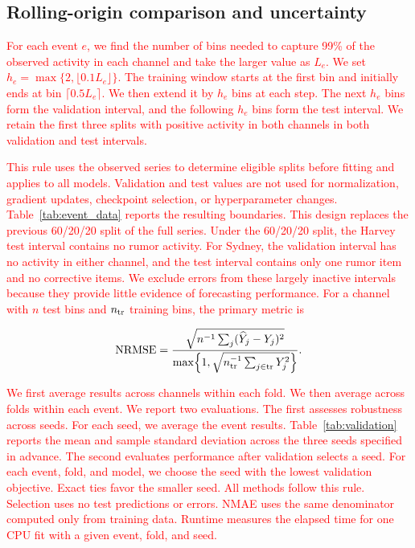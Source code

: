 \documentclass[letterpaper,journal]{IEEEtran}
\begin{document}
	

	\subsection{Rolling-origin comparison and uncertainty}

	\textcolor{red}{
	For each event $e$, we find the number of bins needed to capture 99\% of the observed activity in each channel and take the larger value as $L_e$. 
	We set $h_e=\max\{2,\lfloor0.1L_e\rfloor\}$. 
	The training window starts at the first bin and initially ends at bin $\lceil0.5L_e\rceil$. 
	We then extend it by $h_e$ bins at each step. 
	The next $h_e$ bins form the validation interval, 
	and the following $h_e$ bins form the test interval. 
	We retain the first three splits with positive activity in both channels in both validation and test intervals.
	}

	\textcolor{red}{
	This rule uses the observed series to determine eligible splits before fitting and applies to all models. 
	Validation and test values are not used for normalization, gradient updates, checkpoint selection, or hyperparameter changes. 
	Table~\ref{tab:event_data} reports the resulting boundaries.
	}
	\textcolor{red}{
	This design replaces the previous 60/20/20 split of the full series. 
	Under the 60/20/20 split, the Harvey test interval contains no rumor activity. 
	For Sydney, the validation interval has no activity in either channel, 
	and the test interval contains only one rumor item and no corrective items. 
	We exclude errors from these largely inactive intervals because they provide little evidence of forecasting performance. 
	For a channel with $n$ test bins and $n_{\rm tr}$ training bins, 
	the primary metric is
	}

	\textcolor{red}{
	\begin{equation}
	\operatorname{NRMSE}=\frac{\sqrt{n^{-1}\sum_j(\widehat Y_j-Y_j)^2}}
	{\max\!\left\{1,\sqrt{n_{\rm tr}^{-1}\sum_{j\in{\rm tr}}Y_j^2}\right\}}.
	\label{eq:nrmse}
	\end{equation}
	}
	
	\textcolor{red}{
We first average results across channels within each fold. We then average across folds within each event. We report two evaluations. The first assesses robustness across seeds. For each seed, we average the event results. Table~\ref{tab:validation} reports the mean and sample standard deviation across the three seeds specified in advance.
The second evaluates performance after validation selects a seed. For each event, fold, and model, we choose the seed with the lowest validation objective. Exact ties favor the smaller seed. All methods follow this rule. Selection uses no test predictions or errors. NMAE uses the same denominator computed only from training data. Runtime measures the elapsed time for one CPU fit with a given event, fold, and seed.
}
\end{document}
